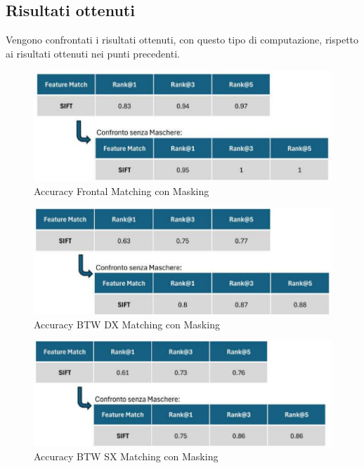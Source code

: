 \documentclass[12pt,a4paper,openright,twoside]{book}
\begin{document}
\begin{figure}[H]
	\centering
    	
\end{figure} 

\subsection{Risultati ottenuti}
Vengono confrontati i risultati ottenuti, con questo tipo di computazione, rispetto ai risultati ottenuti nei punti precedenti.
\begin{figure}[H]
	\centering
	\includegraphics{figures/frontal2_1.pdf}
    	\caption{Accuracy Frontal Matching con Masking}
	\label{fig:frontal2}
\end{figure}
\begin{figure}[H]
	\centering
	\includegraphics{figures/dx2_1.pdf}
    	\caption{Accuracy BTW DX Matching con Masking}
	\label{fig:dx2}
\end{figure}
\begin{figure}[H]
	\centering
	\includegraphics{figures/sx2_1.pdf}
    	\caption{Accuracy BTW SX Matching con Masking}
	\label{fig:sx2}
\end{figure}
\end{document}
